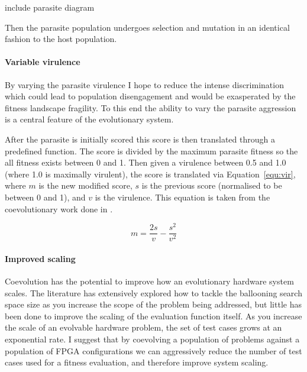 \todo include parasite diagram

Then the parasite population undergoes selection and mutation in an identical
fashion to the host population.

\paragraph{Variable virulence}
By varying the parasite virulence I hope to reduce the intense discrimination
which could lead to population disengagement and would be exasperated by the
fitness landscape fragility. To this end the ability to vary the parasite
aggression is a central feature of the evolutionary system.

After the parasite is initially scored this score is then translated through
a predefined function. The score is divided by the maximum parasite fitness so
the all fitness exists between 0 and 1. Then given a virulence
between 0.5 and 1.0 (where 1.0 is maximally virulent), the score is translated
via Equation~\ref{equ:vir}, where $m$ is the new modified score, $s$ is the
previous score (normalised to be between 0 and 1), and $v$ is the virulence.
This equation is taken from the coevolutionary work done in \cite{6790490}.

\begin{equation}
	\label{equ:vir}
	m = \frac{2s}{v} - \frac{s^2}{v^2}
\end{equation}

\paragraph{Improved scaling}
Coevolution has the potential to improve how an evolutionary hardware system scales.
The literature has extensively explored how to tackle the ballooning search space size
as you increase the scope of the problem being addressed, but little has been done
to improve the scaling of the evaluation function itself. As you increase the scale
of an evolvable hardware problem, the set of test cases grows at an exponential rate.
I suggest that by coevolving a population of problems against a population of FPGA
configurations we can aggressively reduce the number of test cases used for a fitness
evaluation, and therefore improve system scaling.

